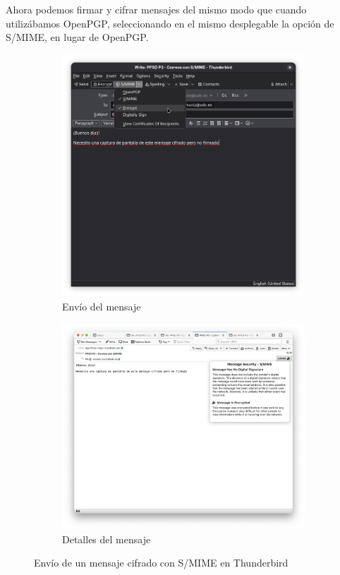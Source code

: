 Ahora podemos firmar y cifrar mensajes del mismo modo que cuando utilizábamos OpenPGP, seleccionando en el mismo desplegable la opción de S/MIME, en lugar de OpenPGP.

\begin{figure}[H]
    \centering
    \begin{subfigure}{.5\textwidth}
        \centering
        \includegraphics[width=\linewidth]{thunderbird-smime-cifrado.png}
        \caption{Envío del mensaje}
    \end{subfigure}%
    \begin{subfigure}{.5\textwidth}
        \centering
        \includegraphics[width=1.2\linewidth]{thunderbird-smime-detalles-cifrado.png}
        \caption{Detalles del mensaje}
    \end{subfigure}
    \caption{Envío de un mensaje cifrado con S/MIME en Thunderbird}
\end{figure}

